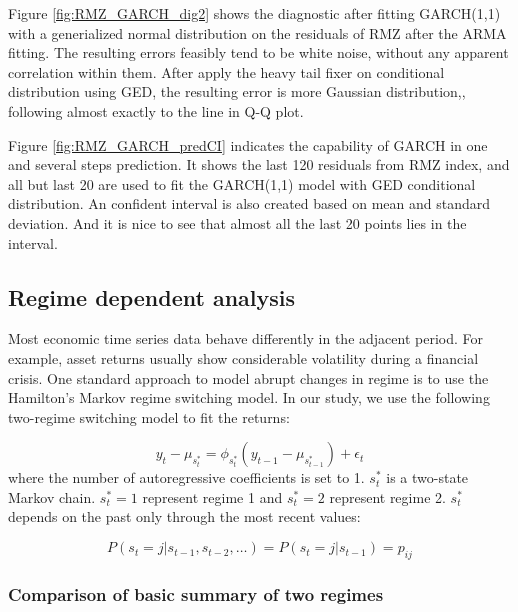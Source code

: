 \documentclass[11pt]{article}
\begin{document}
Figure \ref{fig:RMZ_GARCH_dig2} shows the diagnostic after fitting GARCH(1,1) with a generialized normal distribution on the residuals of RMZ after the ARMA fitting. The resulting errors feasibly tend to be white noise, without any apparent correlation within them. After apply the heavy tail fixer on conditional distribution using GED, the resulting error is more Gaussian distribution,, following almost exactly to the line in Q-Q plot.

Figure \ref{fig:RMZ_GARCH_predCI} indicates the capability of GARCH in one and several steps prediction. It shows the last 120 residuals from RMZ index, and all but last 20 are used to fit the GARCH(1,1) model with GED conditional distribution.  An confident interval is also created based on mean and standard deviation. And it is nice to see that almost all the last 20 points lies in the interval.

\subsection{Regime dependent analysis}

Most economic time series data behave differently in the adjacent period. For example, asset returns
usually show considerable volatility during a financial crisis. One standard approach to model abrupt changes in regime is to use the Hamilton's Markov regime switching model\cite{hamilton1994time}\cite{hamilton1990analysis}. In our study, we use the following two-regime switching model to fit the returns:

\begin{equation}
y_t - \mu_{s^*_t} = \phi_{s^*_t} (y_{t-1} - \mu_{s^*_{t-1}}) + \epsilon_t
\end{equation}
where the number of autoregressive coefficients is set to 1. $s^*_t$ is a two-state Markov chain. $s^*_t = 1$ represent regime 1 and $s^*_t = 2$ represent regime 2. $s^*_t$ depends on the past only through the most recent values:

\begin{equation}
P(s_t = j|s_{t-1}, s_{t-2}, \dots) = P(s_t = j|s_{t-1})  = p_{ij}
\end{equation}

\subsubsection{Comparison of basic summary of two regimes}
\end{document}
